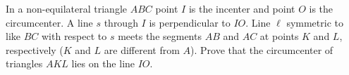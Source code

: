 In a non-equilateral triangle $ABC$ point $I$ is the incenter and point $O$ is the circumcenter. A line $s$ through $I$ is perpendicular to $IO$. Line $\ell$ symmetric to like $BC$ with respect to $s$ meets the segments $AB$ and $AC$ at points $K$ and $L$,  respectively ($K$ and $L$ are different from $A$). Prove that the circumcenter of triangles $AKL$ lies on the line $IO$.